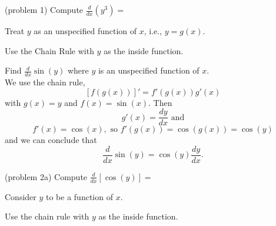 \documentclass[handout]{ximera}
\begin{document}
\begin{problem}(problem 1)
Compute
$\displaystyle{\frac{d}{dx} \left(y^3\right)=}$
 
\begin{multipleChoice}
\end{multipleChoice}

\begin{hint}
Treat $y$ as an unspecified function of $x$, i.e., $y = g(x)$.
\end{hint}

\begin{hint}
Use the Chain Rule with $y$ as the inside function.
\end{hint}
		
\end{problem}


  

\begin{example}[example 2]
Find $\frac{d}{dx} \sin(y)$ where $y$ is an unspecified function of $x$.\\
We use the chain rule,
\[\displaystyle{[f(g(x))]' = f'(g(x))g'(x)}\]
with $g(x) = y$ and $f(x) = \sin(x)$. Then 
\[g'(x) = \frac{dy}{dx} \text{ and}\]
\[f'(x) = \cos(x), \text{ so } f'(g(x)) = \cos(g(x)) = \cos(y)\]
and we can conclude that
\[\frac{d}{dx} \sin(y) = \cos(y) \frac{dy}{dx}.\]
\end{example}


\begin{center}
\begin{foldable}
\end{foldable}
\end{center}

\begin{problem}(problem 2a)
Compute
$\displaystyle{\frac{d}{dx} \left[\cos(y)\right]=}$
 
\begin{multipleChoice}
\end{multipleChoice}  
  
  
	  
    \begin{hint}
      Consider $y$ to be a function of $x$.
    \end{hint}
    \begin{hint}
      Use the chain rule with $y$ as the inside function.
    \end{hint}
		
\end{problem}
\end{document}
